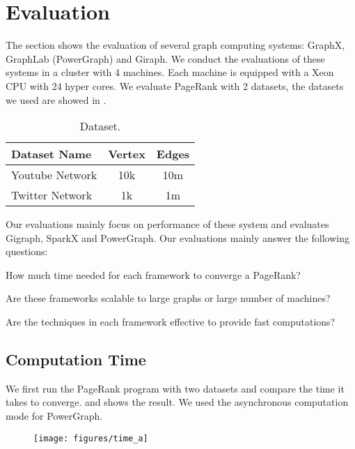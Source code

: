\section{Evaluation}
The section shows the evaluation of several graph computing systems:
GraphX, GraphLab (PowerGraph) and Giraph.
We conduct the evaluations of these systems in a cluster with 4 machines.
Each machine is equipped with a Xeon CPU with 24 hyper cores.
We evaluate PageRank with 2 datasets, the datasets we used are showed in
.

\begin{table}[tbh]
  \begin{tabular}{l|c|c}
    \textbf{Dataset Name} & \textbf{Vertex} & \textbf{Edges} \\
      \hline
      Youtube Network & 10k & 10m \\
      \hline
      Twitter Network & 1k & 1m
  \end{tabular}
  \caption{Dataset.}
  \label{tab:dataset}
\end{table}

Our evaluations mainly focus on performance of these system and evaluates
Gigraph, SparkX and PowerGraph.
Our evaluations mainly answer the following questions:
\begin{tightenum}

\item[\S\ref{subsec:time}:] How much time needed for each framework
to converge a PageRank?

\item[\S\ref{subsec:scalability}:] Are these frameworks scalable to
large graphs or large number of machines?

\item[\S\ref{subsec:technique}:] Are the techniques in each framework
effective to provide fast computations?
\end{tightenum}

\subsection{Computation Time} \label{subsec:time}
We first run the PageRank program with two datasets and compare the
time it takes to converge.  and 
shows the result. We used the asynchronous computation mode
for PowerGraph.

\begin{figure}
  \texttt{[image: figures/time\_a]}
  \caption{}
  \label{fig:time:a}
\end{figure}

